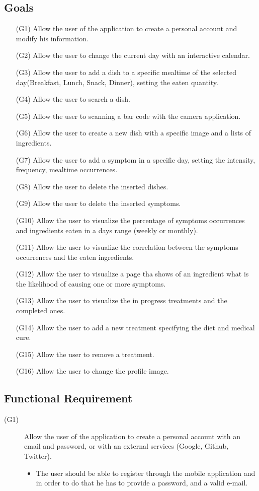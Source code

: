 \documentclass [12pt]{article}
\begin{document}
\subsection{Goals}
\begin{enumerate}
\item[(G1)]Allow the user of the application to create a personal account and modify his information.
\item[(G2)]Allow the user to change the current day with an interactive calendar.
\item[(G3)]Allow the user to add a dish to a specific mealtime of the selected day(Breakfast, Lunch, Snack, Dinner), setting the eaten quantity.
\item[(G4)]Allow the user to search a dish.
\item[(G5)]Allow the user to scanning a bar code with the camera application.
\item[(G6)]Allow the user to create a new dish with a specific image and a lists of ingredients. 
\item[(G7)]Allow the user to add a symptom in a specific day, setting the intensity, frequency, mealtime occurrences.
\item[(G8)]Allow the user to delete the inserted dishes.
\item[(G9)]Allow the user to delete the inserted symptoms.
\item[(G10)]Allow the user to visualize the percentage of symptoms occurrences and ingredients eaten in a days range (weekly or monthly).
\item[(G11)]Allow the user to visualize the correlation between the symptoms occurrences and the eaten ingredients.
\item[(G12)]Allow the user to visualize a page tha shows of an ingredient what is the likelihood of causing one or more symptoms.
\item[(G13)]Allow the user to visualize the in progress treatments and the completed ones.
\item[(G14)]Allow the user to add a new treatment specifying the diet and medical cure.
\item[(G15)]Allow the user to remove a treatment.
\item[(G16)]Allow the user to change the profile image.


\end{enumerate}
\subsection{Functional Requirement}
\begin{description}
\item[(G1)]Allow the user of the application to create a personal account with an email and password, or with an external services (Google, Github, Twitter).
\begin{itemize}
\item The user should be able to register through the mobile application and in order to do that he has to provide a password, and a valid e-mail.\\
\end{itemize}
\end{description}
\end{document}
